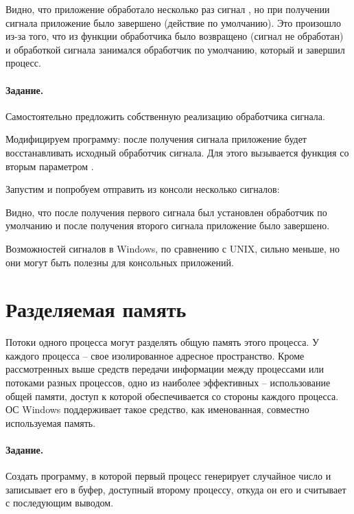 

Видно, что приложение обработало несколько раз сигнал \caret{}, но при получении сигнала  приложение было завершено (действие по умолчанию). Это произошло из-за того, что из функции обработчика было возвращено  (сигнал не обработан) и обработкой сигнала занимался обработчик по умолчанию, который и завершил процесс.

\paragraph{Задание.} Самостоятельно предложить собственную реализацию обработчика сигнала.

Модифицируем программу: после получения сигнала \caret{} приложение будет восстанавливать исходный обработчик сигнала. Для этого вызывается функция  со вторым параметром .



Запустим  и попробуем отправить из консоли несколько сигналов:



Видно, что после получения первого сигнала \caret{} был установлен обработчик по умолчанию и после получения второго сигнала приложение было завершено.

Возможностей сигналов в Windows, по сравнению с UNIX, сильно меньше, но они могут быть полезны для консольных приложений.

\section{Разделяемая память}

Потоки одного процесса могут разделять общую память этого процесса. У каждого процесса -- свое изолированное адресное пространство. Кроме рассмотренных выше средств передачи информации между процессами или потоками разных процессов, одно из наиболее эффективных – использование общей памяти, доступ к которой обеспечивается со стороны каждого процесса. ОС Windows поддерживает такое средство, как именованная, совместно используемая память.

\paragraph{Задание.} Создать программу, в которой первый процесс генерирует случайное число и записывает его в буфер, доступный второму процессу, откуда он его и считывает с последующим выводом.

